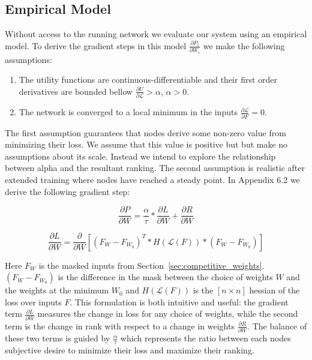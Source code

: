 \documentclass{article}
\begin{document}
\subsection{Empirical Model}

Without access to the running network we evaluate our system using an empirical model. To derive the gradient steps in this model $\frac{\partial P_i}{\partial W_i}$ we make the following assumptions: 

\begin{enumerate}
	\item The utility functions are continuous-differentiable and their first order derivatives are bounded bellow $\frac{\partial U}{\partial \mathcal{L}} > \alpha$, $\alpha > 0$.     
	\item  The network is converged to a local minimum in the inputs $\frac{\partial\mathcal{L}}{\partial F} = 0$.
\end{enumerate}  

The first assumption guarantees that nodes derive some non-zero value from minimizing their loss. We assume that this value is positive but but make no assumptions about its scale. Instead we intend to explore the relationship between alpha and the resultant ranking. The second assumption is realistic after extended training where nodes have reached a steady point. In Appendix 6.2 we derive the following gradient step:

\begin{equation}
\label{eq:iterative_descent1}
\frac{\partial P}{\partial W} = \frac{\alpha}{\tau} * \frac{\partial L}{\partial W} + \frac{\partial R}{\partial W}
\end{equation}


\begin{equation}
\label{eq:iterative_descent2}
\frac{\partial L}{\partial W} = \frac{\partial}{\partial W} [(F_W - F_{W_0})^T * H( \mathcal{L}(F)) * (F_W - F_{W_0})] 
\end{equation}

Here $F_W$ is the masked inputs from Section~\ref{sec:competitive_weights}. $(F_W - F_{W_0})$ is the difference in the mask between the choice of weights $W$ and the weights at the minimum $W_0$ and $H( \mathcal{L}(F))$ is the $[n \times n]$ hessian of the loss over inputs $F$. This formulation is both intuitive and useful: the gradient term $\frac{\partial L}{\partial W}$ measures the change in loss for any choice of weights, while the second term is the change in rank with respect to a change in weights $\frac{\partial R}{\partial W}$. The balance of these two terms is guided by $\frac{\alpha}{\tau}$ which represents the ratio between each nodes subjective desire to minimize their loss and maximize their ranking.
\end{document}

